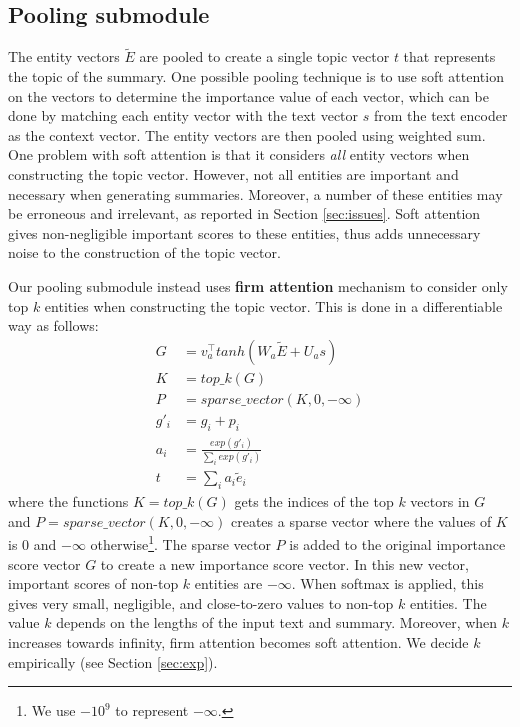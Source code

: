 \documentclass[11pt,a4paper]{article}
\begin{document}
\subsection{Pooling submodule}

The entity vectors $\tilde{E}$ are pooled to create a single topic vector $t$ that represents the topic of the summary. One possible 
pooling technique 
is to use soft attention \cite{xu2015show} on the vectors to determine the importance value of each vector, which can be done by matching each entity vector with the text vector $s$ from the text encoder as the context vector. The entity vectors are then pooled using weighted sum.
One problem with soft attention is that it considers \textit{all} entity vectors when constructing the topic vector. However, not all entities are important and necessary when generating summaries. Moreover, a number of these entities may be erroneous and irrelevant, as reported in Section \ref{sec:issues}. Soft attention gives non-negligible important scores to these entities, thus adds unnecessary noise to the construction of the topic vector.

Our pooling submodule instead uses \textbf{firm attention} mechanism to consider only top $k$ entities when constructing the topic vector. This is done in a differentiable way as follows:
\begin{align*}
    G &= v_a^\top tanh(W_a \tilde{E} + U_a s) \\
    K &= top\_k(G) \\
    P &= sparse\_vector(K, 0, -\infty) \\
    g'_i &= g_i + p_i \\
    a_i &= \frac{exp(g'_i)}{\sum_i exp(g'_i)} \\
    t &= \sum_i a_i \tilde{e}_i \nonumber
\end{align*}
where the functions $K = top\_k(G)$ gets the indices of the top $k$ vectors in $G$ and $P = sparse\_vector(K,0,-\infty)$ creates a sparse vector where the values of $K$ is $0$ and $-\infty$ otherwise\footnote{We use $-10^9$ to represent $-\infty$.}. The sparse vector $P$ is added to the original importance score vector $G$ to create a new importance score vector. In this new vector, important scores of non-top $k$ entities are $-\infty$.
When softmax is applied, this gives very small, negligible, and close-to-zero values to non-top $k$ entities.
The value $k$ depends on the lengths of the input text and summary.
Moreover, when $k$ increases towards infinity, firm attention becomes soft attention.
We decide $k$ empirically (see Section \ref{sec:exp}).
\end{document}
